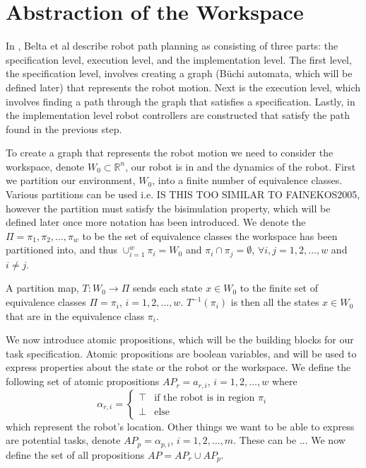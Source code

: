 \section{Abstraction of the Workspace}
In \cite{belta07}, Belta et al describe robot path planning as consisting of three parts: the specification level, execution level, and the implementation level. The first level, the specification level, involves creating a graph (B\"{u}chi automata, which will be defined later) that represents the robot motion. Next is the execution level, which involves finding a path through the graph that satisfies a specification. Lastly, in the implementation level robot controllers are constructed that satisfy the path found in the previous step. 

To create a graph that represents the robot motion we need to consider the workspace, denote $W_0 \subset \mathbb{R}^n$, our robot is in and the dynamics of the robot. First we partition our environment, $W_0$, into a finite number of equivalence classes. Various partitions can be used i.e. \cite{belta04} IS THIS TOO SIMILAR TO FAINEKOS2005, however the partition must satisfy the bisimulation property, which will be defined later once more notation has been introduced. We denote the $\Pi = {\pi_1, \pi_2, \dots, \pi_w}$ to be the set of equivalence classes the workspace has been partitioned into, and thus $\cup_{i=1}^w \pi_i = W_0$ and $\pi_i \cap \pi_j = \emptyset$, $\forall i,j=1,2,\dots,w$ and $i\neq j$. 

\begin{definition}
\label{defLF}
A partition map, $T: W_0 \rightarrow \Pi$ sends each state $x \in W_0$ to the finite set of equivalence classes $\Pi = {\pi_i}$,  $i = 1,2,\dots ,w$. $T^{-1}(\pi_i)$ is then all the states $x \in W_0$ that are in the equivalence class $\pi_i$. 
\end{definition} 

We now introduce atomic propositions, which will be the building blocks for our task specification. Atomic propositions are boolean variables, and will be used to express properties about the state or the robot or the workspace. We define the following set of atomic propositions $AP_r = {a_{r,i}}$, $i=1,2,\dots,w$ where 
\[\alpha_{r,i} =  \begin{cases}
\top & \text{if the robot is in region $\pi_i$} \\
\bot & \text{else}
\end{cases}
\]
which represent the robot's location. Other things we want to be able to express are potential tasks, denote $AP_p = {\alpha_{p,i}}$, $i=1,2,\dots,m$. These can be ...
We now define the set of all propositions $AP = AP_r \cup AP_p$.

